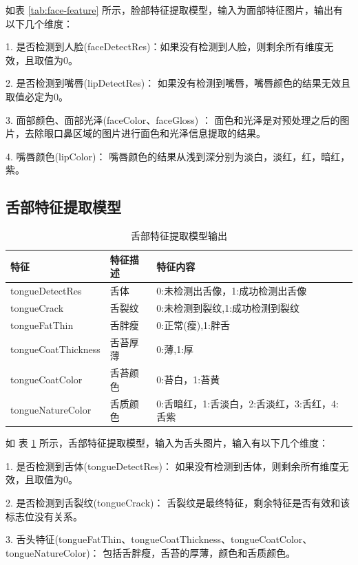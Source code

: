 如表 \ref{tab:face-feature} 所示，脸部特征提取模型，输入为面部特征图片，输出有以下几个维度：

1. 是否检测到人脸(faceDetectRes)：如果没有检测到人脸，则剩余所有维度无效，且取值为0。

2. 是否检测到嘴唇(lipDetectRes)： 如果没有检测到嘴唇，嘴唇颜色的结果无效且取值必定为0。

3. 面部颜色、面部光泽(faceColor、faceGloss) ： 面色和光泽是对预处理之后的图片，去除眼口鼻区域的图片进行面色和光泽信息提取的结果。

4. 嘴唇颜色(lipColor)： 嘴唇颜色的结果从浅到深分别为淡白，淡红，红，暗红，紫。



\subsection{舌部特征提取模型}

\begin{table}[]
    \centering
    \begin{tabular}{lll}
        \toprule
        特征 & 特征描述 & 特征内容 \\ 
        \midrule
        tongueDetectRes & 舌体 & 0:未检测出舌像，1:成功检测出舌像 \\
        tongueCrack & 舌裂纹 & 0:未检测到裂纹,1:成功检测到裂纹 \\ 
        tongueFatThin & 舌胖瘦 & 0:正常(瘦),1:胖舌 \\
        tongueCoatThickness & 舌苔厚薄 & 0:薄,1:厚 \\
        tongueCoatColor & 舌苔颜色 & 0:苔白，1:苔黄 \\
        tongueNatureColor & 舌质颜色 & 0:舌暗红，1:舌淡白，2:舌淡红，3:舌红，4:舌紫\\
        \bottomrule
    \end{tabular}

    \caption{舌部特征提取模型输出}
    \label{tab:tongue-feature}
\end{table}

如 表 \ref{tab:tongue-feature} 所示，舌部特征提取模型，输入为舌头图片，输入有以下几个维度：

1. 是否检测到舌体(tongueDetectRes)： 如果没有检测到舌体，则剩余所有维度无效，且取值为0。

2. 是否检测到舌裂纹(tongueCrack)： 舌裂纹是最终特征，剩余特征是否有效和该标志位没有关系。

3. 舌头特征(tongueFatThin、tongueCoatThickness、tongueCoatColor、tongueNatureColor)： 包括舌胖瘦，舌苔的厚薄，颜色和舌质颜色。



